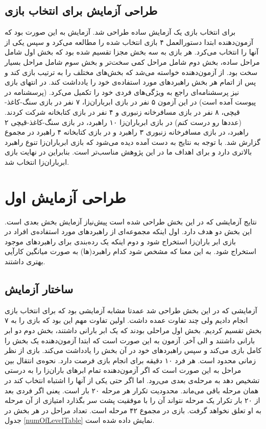 \documentclass[twoside, a4paper,11pt]{book}
\numberwithin{equation}{chapter}
\numberwithin{table}{chapter}
\numberwithin{figure}{chapter}
\numberwithin{equation}{chapter}
\begin{document}
\subsection{طراحی آزمایش برای انتخاب بازی}
برای انتخاب بازی یک آزمایش ساده طراحی شد. آزمایش به این صورت بود که آزمون‌دهنده ابتدا دستورالعمل ۴ بازی انتخاب شده را مطالعه می‌کرد و سپس یکی از آنها را انتخاب می‌کرد. هر بازی به سه بخش مجزا تقسیم شده بود که بخش اول شامل مراحل ساده، بخش دوم شامل مراحل کمی سخت‌تر و بخش سوم شامل مراحل بسیار سخت بود. از آزمون‌دهنده خواسته می‌شد که بخش‌های مختلف را به ترتیب بازی کند و پس از اتمام هر بخش راهبرد‌های مورد استفاده‌ی خود را یادداشت کند. در انتهای بازی نیز پرسشنامه‌ای راجع به ویژگی‌های فردی خود را تکمیل می‌کرد. (پرسشنامه در پیوست آمده است)
در این آزمون ۵ نفر در بازی ابرباران‌زا، ۷ نفر در بازی سنگ-کاغذ-قیچی، ۸ نفر در بازی مسافرخانه زنبوری و ۴ نفر در بازی کتابخانه شرکت کردند. (عددها رو درست کنم) در بازی ابرباران‌زا ۱۰ راهبرد، در بازی سنگ-کاغذ-قیچی ۲ راهبرد، در بازی مسافرخانه زنبوری ۳ راهبرد و در بازی کتابخانه ۴ راهبرد در مجموع گزارش شد. با توجه به نتایج به دست آمده دیده می‌شود که بازی ابرباران‌زا تنوع راهبرد بالاتری دارد و برای اهداف ما در این پژوهش مناسب‌تر است. بنابراین در نهایت بازی ابرباران‌زا انتخاب شد.

\section{طراحی آزمایش اول}
نتایج آزمایشی که در این بخش طراحی شده است پیش‌نیاز آزمایش بخش بعدی است. این بخش دو هدف دارد. اول اینکه مجموعه‌ای از راهبرد‌های مورد استفاده‌ی افراد در بازی ابر باران‌زا استخراج شود و دوم اینکه یک رده‌بندی برای راهبرد‌های موجود استخراج شود. به این معنا که مشخص شود کدام راهبرد‌(ها) به صورت میانگین کارآیی بهتری داشتند.

\subsection{ساختار آزمایش}
آزمایشی که در این بخش طراحی شد عمدتا مشابه آزمایشی بود که برای انتخاب بازی انجام دادیم ولی چند تفاوت عمده داشت. اولین تفاوت مهم این بود که بازی را به ۷ بخش تقسیم کردیم. بخش اول مراحلی بودند که یک ابر بارانی داشتند، بخش دوم دو ابر بارانی داشتند و الی آخر. آزمون به این صورت است که ابتدا آزمون‌دهنده یک بخش را کامل بازی می‌کند و سپس راهبرد‌های خود در آن بخش را یادداشت می‌کند. بازی از نظر زمانی محدود است. هر فرد ۱۰ دقیقه برای انجام بازی فرصت دارد. نحوه‌ی انتقال بین مراحل به این صورت است که اگر آزمون‌دهنده تمام ابرهای باران‌زا را به درستی تشخیص دهد به مرحله‌ی بعدی می‌رود. اما اگر حتی یکی از آنها را اشتباه انتخاب کند در همان مرحله باقی می‌ماند. محدودیت تکرار هر مرحله ۲۰ بار است. یعنی اگر فردی بعد از ۲۰ بار تکرار یک مرحله نتواند آن را با موفقیت پشت سر بگذارد امتیازی از آن مرحله به او تعلق نخواهد گرفت. بازی در مجموع ۴۲ مرحله است. تعداد مراحل در هر بخش در جدول \ref{numOfLevelTable} نمایش داده شده است.
\end{document}
